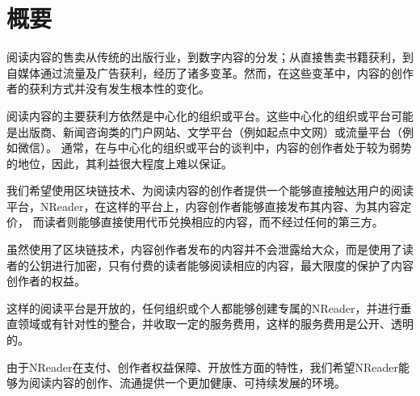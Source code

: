 \section{概要}
阅读内容的售卖从传统的出版行业，到数字内容的分发；从直接售卖书籍获利，到自媒体通过流量及广告获利，经历了诸多变革。然而，在这些变革中，内容的创作者的获利方式并没有发生根本性的变化。

阅读内容的主要获利方依然是中心化的组织或平台。这些中心化的组织或平台可能是出版商、新闻咨询类的门户网站、文学平台（例如起点中文网）或流量平台（例如微信）。
通常，在与中心化的组织或平台的谈判中，内容的创作者处于较为弱势的地位，因此，其利益很大程度上难以保证。


我们希望使用区块链技术、为阅读内容的创作者提供一个能够直接触达用户的阅读平台，NReader，在这样的平台上，内容创作者能够直接发布其内容、为其内容定价，
而读者则能够直接使用代币兑换相应的内容，而不经过任何的第三方。

虽然使用了区块链技术，内容创作者发布的内容并不会泄露给大众，而是使用了读者的公钥进行加密，只有付费的读者能够阅读相应的内容，最大限度的保护了内容创作者的权益。

这样的阅读平台是开放的，任何组织或个人都能够创建专属的NReader，并进行垂直领域或有针对性的整合，并收取一定的服务费用，这样的服务费用是公开、透明的。

由于NReader在支付、创作者权益保障、开放性方面的特性，我们希望NReader能够为阅读内容的创作、流通提供一个更加健康、可持续发展的环境。

